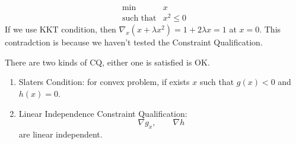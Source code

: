 \begin{example}
\[
\begin{array}{ll}
\min&x\\
\mbox{such that}&x^2\le0
\end{array}
\]
If we use KKT condition, then $\nabla_x(x+\lambda x^2)=1+2\lambda x=1$ at $x=0$. This contradction is because we haven't tested the Constraint Qualification.
\end{example}
There are two kinds of CQ, either one is satisfied is OK.
\begin{enumerate}
\item
Slaters Condition: for convex problem, if exists $x$ such that $g(x)<0$ and $h(x)=0$.
\item
Linear Independence Constraint Qualification:
\[
\nabla g_x,\qquad \nabla h
\]
are linear independent.
\end{enumerate}


















